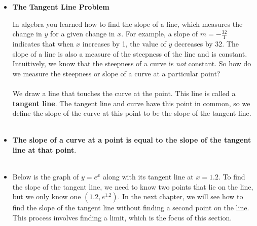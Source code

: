 \documentclass[handout]{ximera}  %
\begin{document}
   




\begin{itemize}
   \item \textbf{The Tangent Line Problem}
    
    In algebra you learned how to find the slope of a line, which
    measures the change in $y$ for a given change in $x.$ For example,
    a slope of $m=-\frac{32}{1}$ indicates that when $x$ increases by
    1, the value of $y$ decreases by 32. The slope of a line is also a
    measure of the steepness of the line and is constant. Intuitively,
    we know that the steepness of a curve is \emph{not} constant.  So
    how do we measure the steepness or slope of a curve at a
    particular point? \\ \\ 
    
    We draw a line that touches the curve at the point.
    This line is called a \textbf{tangent line}. The tangent line and
    curve have this point in common, so we define the slope of the
    curve at this point to be the slope of the tangent line. \\ \\
      
    \item[] \textbf{The slope of a curve at  a point is equal to the slope of the tangent line at that point}. \\  \\
    
    \item[] Below is the graph of $y=e^x$ along
    with its tangent line at $x=1.2.$  To find the slope of the tangent line, we need to
    know two points that lie on the line, but we only know one $(1.2,
    e^{1.2}).$ In the next chapter, we will see how to find the slope
    of the tangent line without finding a second point on the line.
    This process involves finding a limit, which is the focus of this
    section.
    
    
    

\end{itemize}
\end{document}

